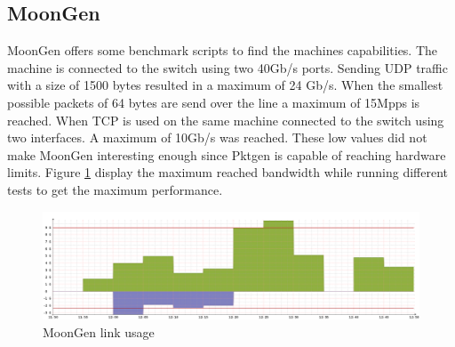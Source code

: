 \subsection{MoonGen}
MoonGen offers some benchmark scripts to find the machines capabilities. The machine is connected to the switch using two 40Gb/s ports. Sending UDP traffic with a size of 1500 bytes resulted in a maximum of 24 Gb/s. When the smallest possible packets of 64 bytes are send over the line a maximum of 15Mpps is reached. When TCP is used on the same machine connected to the switch using two interfaces. A maximum of 10Gb/s was reached. These low values did not make MoonGen interesting enough since Pktgen is capable of reaching hardware limits. Figure \ref{fig:moongenlink} display the maximum reached bandwidth while running different tests to get the maximum performance. 

\begin{figure}[H]
  \includegraphics[scale=0.35]{images/moongen_link_usage.png}
  \caption{MoonGen link usage}
  \label{fig:moongenlink}
\end{figure}





